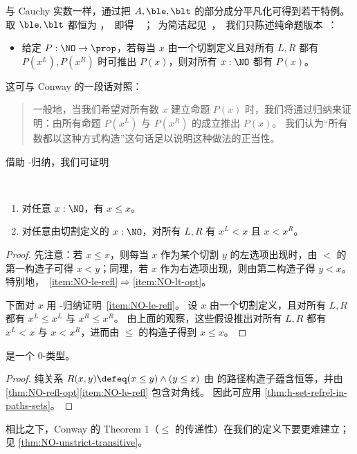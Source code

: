 与 Cauchy 实数一样，通过把 $A,\ble,\blt$ 的部分成分平凡化可得到若干特例。
取 $\ble,\blt$ 都恒为 \unit，即得 ；为简洁起见，我们只陈述纯命题版本：
\begin{itemize}
\item 给定 $P:\NO\to\prop$，若每当 $x$ 由一个切割定义且对所有 $L,R$ 都有 $P(x^L),P(x^R)$ 时可推出 $P(x)$，则对所有 $x:\NO$ 都有 $P(x)$。
\end{itemize}
这可与 Conway 的一段话对照：
\begin{quote}\footnotesize
  一般地，当我们希望对所有数 $x$ 建立命题 $P(x)$ 时，我们将通过归纳来证明：由所有命题 $P(x^L)$ 与 $P(x^R)$ 的成立推出 $P(x)$。
  我们认为“所有数都以这种方式构造”这句话足以说明这种做法的正当性。
\end{quote}
借助 \NO-归纳，我们可证明

\begin{thm}\label{thm:NO-refl-opt}\
  \begin{enumerate}
  \item 对任意 $x:\NO$，有 $x\le x$。\label{item:NO-le-refl}
  \item 对任意由切割定义的 $x:\NO$，对所有 $L,R$ 有 $x^L <x$ 且 $x<x^R$。\label{item:NO-lt-opt}
  \end{enumerate}
\end{thm}
\begin{proof}
  先注意：若 $x\le x$，则每当 $x$ 作为某个切割 $y$ 的左选项出现时，由 $<$ 的第一构造子可得 $x<y$；同理，若 $x$ 作为右选项出现，则由第二构造子得 $y<x$。
  特别地，~\ref{item:NO-le-refl}$\Rightarrow$\ref{item:NO-lt-opt}。

  下面对 $x$ 用 \NO-归纳证明~\ref{item:NO-le-refl}。
  设 $x$ 由一个切割定义，且对所有 $L,R$ 都有 $x^L\le x^L$ 与 $x^R \le x^R$。
  由上面的观察，这些假设推出对所有 $L,R$ 都有 $x^L<x$ 与 $x<x^R$，进而由 $\le$ 的构造子得到 $x\le x$。
\end{proof}

\begin{cor}\label{thm:NO-set}
  \NO 是一个 0-类型。
\end{cor}
\begin{proof}
  纯关系 $R(x,y)\defeq (x\le y) \land (y\le x)$ 由 \NO 的路径构造子蕴含恒等，并由 \cref{thm:NO-refl-opt}\ref{item:NO-le-refl} 包含对角线。
  因此可应用 \cref{thm:h-set-refrel-in-paths-sets}。
\end{proof}

相比之下，Conway 的 Theorem 1（$\le$ 的传递性）在我们的定义下要更难建立；见 \cref{thm:NO-unstrict-transitive}。


